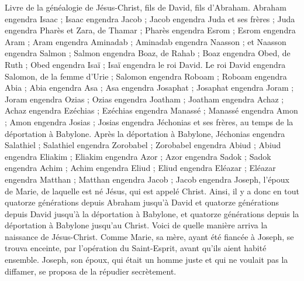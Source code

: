 \begin{multicols}{2}
\VerseOne{}Livre de la généalogie de Jésus-Christ, fils de David, fils d'Abraham.
Abraham engendra Isaac ; Isaac engendra Jacob ; Jacob engendra Juda et ses frères ;
Juda engendra Pharès et Zara, de Thamar ; Pharès engendra Esrom ; Esrom engendra Aram ;
Aram engendra Aminadab ; Aminadab engendra Naasson ; et Naasson engendra Salmon ;
Salmon engendra Boaz, de Rahab ; Boaz engendra Obed, de Ruth ; Obed engendra Isaï ;
Isaï engendra le roi David. Le roi David engendra Salomon, de la femme d'Urie ;
Salomon engendra Roboam ; Roboam engendra Abia ; Abia engendra Asa ;
Asa engendra Josaphat ; Josaphat engendra Joram ; Joram engendra Ozias ;
Ozias engendra Joatham ; Joatham engendra Achaz ; Achaz engendra Ezéchias ;
Ezéchias engendra Manassé ; Manassé engendra Amon ; Amon engendra Josias ;
Josias engendra Jéchonias et ses frères, au temps de la déportation à Babylone.
Après la déportation à Babylone, Jéchonias engendra Salathiel ; Salathiel engendra Zorobabel ;
Zorobabel engendra Abiud ; Abiud engendra Eliakim ; Eliakim engendra Azor ;
Azor engendra Sadok ; Sadok engendra Achim ; Achim engendra Eliud ;
Eliud engendra Eléazar ; Eléazar engendra Matthan ; Matthan engendra Jacob ;
Jacob engendra Joseph, l'époux de Marie, de laquelle est né Jésus, qui est appelé Christ.
Ainsi, il y a donc en tout quatorze générations depuis Abraham jusqu'à David et quatorze générations depuis David jusqu'à la déportation à Babylone, et quatorze générations depuis la déportation à Babylone jusqu'au Christ.
Voici de quelle manière arriva la naissance de Jésus-Christ. Comme Marie, sa mère, ayant été fiancée à Joseph, se trouva enceinte, par l'opération du Saint-Esprit, avant qu'ils aient habité ensemble.
Joseph, son époux, qui était un homme juste et qui ne voulait pas la diffamer, se proposa de la répudier secrètement.

\end{multicols}
